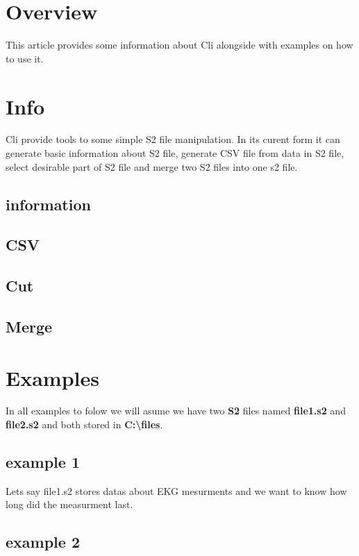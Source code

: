 \documentclass[english]{article}
\begin{document}
\section{Overview}

This article provides some information about Cli alongside with examples on how to use it.

\section{Info}

Cli provide tools to some simple S2 file manipulation. In its curent form it can generate basic information about S2 file, generate CSV file from data in S2 file, select desirable part of S2 file and merge two S2 files into one s2 file.

\subsection{information}

\subsection{CSV}

\subsection{Cut}

\subsection{Merge}

\section{Examples}

In all examples to folow we will asume we have two \textbf{S2} files named \textbf{file1.s2} and \textbf{file2.s2} and both stored in \textbf{C:\textbackslash files}. 

\subsection{example 1}
Lets say file1.s2 stores datas about EKG mesurments and we want to know how long did the measurment last.

\subsection{example 2}
\end{document}

